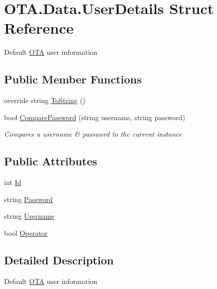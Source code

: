 \hypertarget{struct_o_t_a_1_1_data_1_1_user_details}{}\section{O\+T\+A.\+Data.\+User\+Details Struct Reference}
\label{struct_o_t_a_1_1_data_1_1_user_details}


Default \hyperlink{namespace_o_t_a}{O\+T\+A} user information  


\subsection*{Public Member Functions}
\begin{DoxyCompactItemize}
\item 
override string \hyperlink{struct_o_t_a_1_1_data_1_1_user_details_a311efd6bfa538a5bfcdfaf3d0907452b}{To\+String} ()
\item 
bool \hyperlink{struct_o_t_a_1_1_data_1_1_user_details_ac06cb5d03c7667ff25774322e570716f}{Compare\+Password} (string username, string password)
\begin{DoxyCompactList}\small\item\em Compares a username \& password to the current instance \end{DoxyCompactList}\end{DoxyCompactItemize}
\subsection*{Public Attributes}
\begin{DoxyCompactItemize}
\item 
int \hyperlink{struct_o_t_a_1_1_data_1_1_user_details_ab9a16f1c53cfd9d6178cb85d2019c996}{Id}
\item 
string \hyperlink{struct_o_t_a_1_1_data_1_1_user_details_a34906dbcc3153205ee426046c122e8c0}{Password}
\item 
string \hyperlink{struct_o_t_a_1_1_data_1_1_user_details_a602319917fd4027ab5769084e9008ab0}{Username}
\item 
bool \hyperlink{struct_o_t_a_1_1_data_1_1_user_details_a1bb854f82be38db8087a9a0158649899}{Operator}
\end{DoxyCompactItemize}


\subsection{Detailed Description}
Default \hyperlink{namespace_o_t_a}{O\+T\+A} user information 



